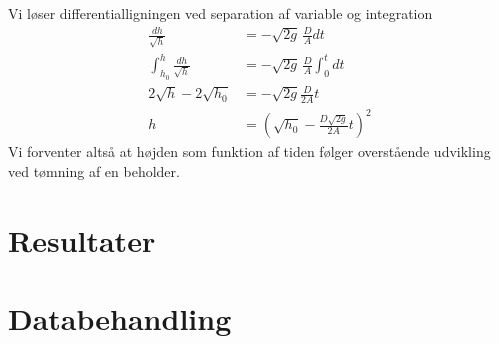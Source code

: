 \documentclass[a4paper, 11pt]{article}
\begin{document}
Vi løser differentialligningen ved separation af variable og integration
\begin{align*}
    \frac{dh}{\sqrt{h}}&=-\sqrt{2g}\,\frac{D}{A}dt\\
    \int_{h_0}^{h}\frac{dh}{\sqrt{h}}&=-\sqrt{2g}\,\frac{D}{A} \int_0^t dt\\
    2\sqrt{h}-2\sqrt{h_0}&=-\sqrt{2g}\frac{D}{2A}t\\
    h&=\left(\sqrt{h_0}-\frac{D\sqrt{2g}}{2A}t\right)^2
\end{align*} 
Vi forventer altså at højden som funktion af tiden følger overstående udvikling ved tømning af en beholder.
\section{Resultater}
\section{Databehandling}
\end{document}
